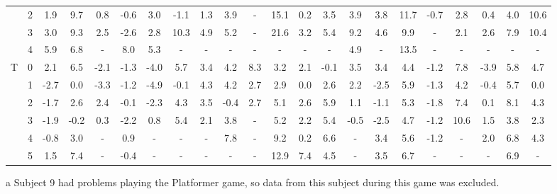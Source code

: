\begin{landscape}
\begin{table*}
\begin{threeparttable}
{\begin{tabular}{cccccccccccccccccccccc}
                      & 2   & 1.9  & 9.7  & 0.8  & -0.6 & 3.0   & -1.1 & 1.3  & 3.9  & -\tnote{a}   & 15.1 & 0.2   & 3.5    & 3.9  & 3.8  & 11.7 & -0.7 & 2.8  & 0.4  & 4.0  & 10.6 \\
                      & 3   & 3.0  & 9.3  & 2.5  & -2.6 & 2.8   & 10.3 & 4.9  & 5.2  & -\tnote{a}   & 21.6 & 3.2   & 5.4    & 9.2  & 4.6  & 9.9  & -    & 2.1  & 2.6  & 7.9  & 10.4 \\
                      & 4   & 5.9  & 6.8  & -    & 8.0  & 5.3   & -    & -    & -    & -\tnote{a}   & -    & -     & -      & 4.9  & -    & 13.5 & -    & -    & -    & -    & -     \\
\hline
\multirow{6}{*}{T}    & 0   & 2.1  & 6.5  & -2.1 & -1.3 & -4.0  & 5.7  & 3.4  & 4.2  & 8.3  & 3.2  & 2.1   & -0.1  & 3.5  & 3.4  & 4.4  & -1.2 & 7.8  & -3.9 & 5.8  & 4.7  \\
                      & 1   & -2.7 & 0.0  & -3.3 & -1.2 & -4.9  & -0.1 & 4.3  & 4.2  & 2.7  & 2.9  & 0.0   & 2.6   & 2.2  & -2.5 & 5.9  & -1.3 & 4.2  & -0.4 & 5.7  & 0.0 \\
                      & 2   & -1.7 & 2.6  & 2.4  & -0.1 & -2.3  & 4.3  & 3.5  & -0.4 & 2.7  & 5.1  & 2.6   & 5.9   & 1.1  & -1.1 & 5.3  & -1.8 & 7.4  & 0.1  & 8.1  & 4.3  \\
                      & 3   & -1.9 & -0.2 & 0.3  & -2.2 & 0.8   & 5.4  & 2.1  & 3.8  & -    & 5.2  & 2.2   & 5.4   & -0.5 & -2.5 & 4.7  & -1.2 & 10.6 & 1.5  & 3.8  & 2.3  \\
                      & 4   & -0.8 & 3.0  & -    & 0.9  & -     & -    & -    & 7.8  & -    & 9.2  & 0.2   & 6.6   & -    & 3.4  & 5.6  & -1.2 & -    & 2.0  & 6.8  & 4.3  \\
                      & 5   & 1.5  & 7.4  & -    & -0.4 & -     & -    & -    & -    & -    & 12.9 & 7.4   & 4.5   & -    & 3.5  & 6.7  & -    & -    & -    & 6.9  & -    \\
\bottomrule
\end{tabular}
}
\begin{tablenotes}
\small
\item[a]{Subject 9 had problems playing the Platformer game, so data from this subject during this game was excluded.}
\end{tablenotes}
\end{threeparttable}
\end{table*}
\end{landscape}

